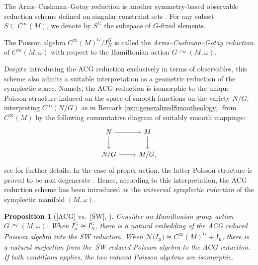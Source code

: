\documentclass[10pt,a4paper]{amsart}
\numberwithin{equation}{section}
\newtheorem{Proposition}[Theorem]{Proposition}
 { \theoremstyle{definition}
\newtheorem{Definition}[Theorem]{Definition}
\newtheorem{Note}[Theorem]{Note}
\newtheorem{Example}[Theorem]{Example}
\newtheorem{Remark}[Theorem]{Remark} }
\DeclareMathOperator{\action}{\curvearrowright}
\renewcommand{\subset}{\subseteq}
\begin{document}
The Arms--Cushman--Gotay reduction is another symmetry-based observable reduction scheme defined on singular constraint sets \cite{ArmsCushmanGotay91}.
For any subset $S\subset C^\infty(M)$, we denote by $S^G$ the subspace of $G$-fixed elements.

\begin{Definition}\label{def:ACGreduction}
	The Poisson algebra $C^\infty(M)^G / I_N^G$ is called the \emph{Arms--Cushman--Gotay reduction} of $C^\infty(M,\omega)$ with respect to the Hamiltonian action $G\action (M,\omega)$.
\end{Definition}

\begin{Remark}
	Despite introducing the ACG reduction exclusively in terms of observables, this scheme also admits a suitable interpretation as a geometric reduction of the symplectic space.
Namely, the ACG reduction is isomorphic to the unique Poisson structure  induced on the space of smooth functions on the variety $N/G$, interpreting $C^\infty(N/G)$ as in Remark \ref{rem:generalizedSmootheology}, from $C^\infty(M)$ by the following commutative diagram of suitably smooth mappings:
	\begin{displaymath}
	\begin{tikzcd}
		N \ar[r]\ar[d] & M \ar[d]\\
		N/G \ar[r]& M/G,
	\end{tikzcd}
	\end{displaymath}
see \cite[Theorem~1]{ArmsCushmanGotay91} for further details.
In the case of proper action, the latter Poisson structure is proved to be non degenerate \cite[Theorem~2]{ArmsCushmanGotay91}.
Hence, according to this interpretation, the ACG reduction scheme has been introduced as the \emph{universal symplectic reduction} of the symplectic manifold $(M,\omega)$.
\end{Remark}

\begin{Proposition}[{[ACG] vs.\ [\'SW], \cite[Theorem~6.1]{ArmsGotayJennings90}}]\label{prop:ACGvsSW}
	Consider an Hamiltonian group action $G\action (M,\omega)$.
	When $I_\mu^G \cong I_N^G$, there is a natural embedding of the ACG reduced Poisson algebra into the SW reduction.
	When $\mathcal{N}\bigl(I_\mu\bigr) \cong C^\infty(M)^G + I_\mu$, there is a natural surjection from the~\'SW reduced Poisson algebra to the ACG reduction.
	If both conditions applies, the two reduced Poisson algebras are isomorphic.
\end{Proposition}
\end{document}
